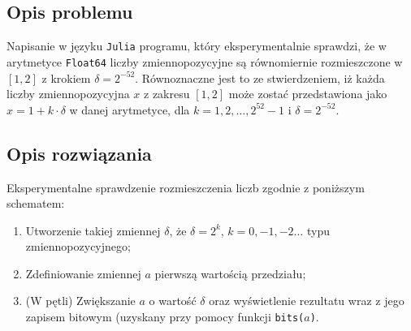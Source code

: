 \documentclass{classrep}
\begin{document}
	\subsection{Opis problemu}
		Napisanie w języku \texttt{Julia} programu, który eksperymentalnie sprawdzi, że w arytmetyce 
		\texttt{Float64} liczby zmiennopozycyjne są równomiernie rozmieszczone w $[1,2]$ z krokiem $\delta = 
		2^{-52}$. Równoznaczne jest to ze stwierdzeniem, iż każda liczby zmiennopozycyjna $x$ z zakresu 
		$[1,2]$ może zostać przedstawiona jako $x = 1 + k \cdot \delta$ w danej arytmetyce, dla 
		$k = 1,2,\dots,2^{52}-1$ i $\delta = 2^{-52}$.
	\subsection{Opis rozwiązania}
		Eksperymentalne sprawdzenie rozmieszczenia liczb zgodnie z poniższym schematem:
		\begin{enumerate}
			\item Utworzenie takiej zmiennej $\delta$, że $\delta = 2^{k}$, $k = 0,-1,-2\dots $ typu 
			zmiennopozycyjnego;
			\item Zdefiniowanie zmiennej $a$ pierwszą wartością przedziału;
			\item (W pętli) Zwiększanie $a$ o wartość $\delta$ oraz wyświetlenie rezultatu
			wraz z jego zapisem bitowym (uzyskany przy pomocy funkcji \texttt{bits($a$)}.
		\end{enumerate}
\end{document}
